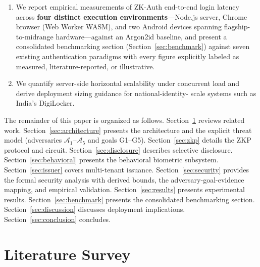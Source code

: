 \documentclass[journal,twoside,10pt]{IEEEtran}
\begin{document}
\begin{enumerate}
        adversary-to-goal and goal-to-evidence traceability mapping
        (Tables~\ref{tab:adv_goal_map} and~\ref{tab:goal_evidence_map}),
        and \textbf{empirical validation} of the replay and
        session-continuity defenses (Section~\ref{sec:empirical_validation}).
  \item We report empirical measurements of ZK-Auth end-to-end login latency
        across \textbf{four distinct execution environments}---Node.js
        server, Chrome browser (Web Worker WASM), and two Android devices
        spanning flagship-to-midrange hardware---against an Argon2id
        baseline, and present a consolidated benchmarking section
        (Section~\ref{sec:benchmark}) against seven existing authentication
        paradigms with every figure explicitly labeled as measured,
        literature-reported, or illustrative.
  \item We quantify server-side horizontal scalability under concurrent
        load and derive deployment sizing guidance for national-identity-
        scale systems such as India's DigiLocker.
\end{enumerate}

The remainder of this paper is organized as follows.
Section~\ref{sec:related} reviews related work.
Section~\ref{sec:architecture} presents the architecture and the explicit
threat model (adversaries $\mathcal{A}_1$--$\mathcal{A}_5$ and goals
G1--G5).
Section~\ref{sec:zkp} details the ZKP protocol and circuit.
Section~\ref{sec:disclosure} describes selective disclosure.
Section~\ref{sec:behavioral} presents the behavioral biometric subsystem.
Section~\ref{sec:issuer} covers multi-tenant issuance.
Section~\ref{sec:security} provides the formal security analysis with
derived bounds, the adversary-goal-evidence mapping, and empirical
validation.
Section~\ref{sec:results} presents experimental results.
Section~\ref{sec:benchmark} presents the consolidated benchmarking section.
Section~\ref{sec:discussion} discusses deployment implications.
Section~\ref{sec:conclusion} concludes.

\section{Literature Survey}
\label{sec:related}
\end{document}
